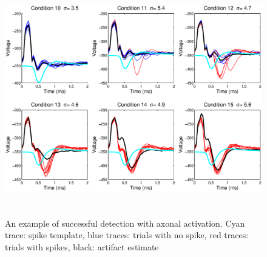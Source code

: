 \documentclass[12pt,letterpaper,fleqn]{article}
\begin{document}
\pagebreak
\begin{figure}[h!]
          \centering
                \includegraphics[height=4in]{TracesEl185pattern1494.eps} 
                \caption{An example of successful detection with axonal activation. Cyan trace: spike template, blue traces: trials with no spike, red traces: trials with spikes, black: artifact estimate}
\end{figure}
\end{document}
